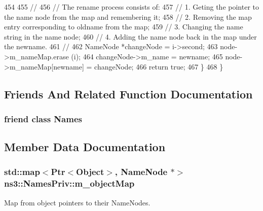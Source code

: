 \begin{DoxyCode}
454 
455       \textcolor{comment}{//}
456       \textcolor{comment}{// The rename process consists of:}
457       \textcolor{comment}{// 1.  Geting the pointer to the name node from the map and remembering it;}
458       \textcolor{comment}{// 2.  Removing the map entry corresponding to oldname from the map;}
459       \textcolor{comment}{// 3.  Changing the name string in the name node;}
460       \textcolor{comment}{// 4.  Adding the name node back in the map under the newname.}
461       \textcolor{comment}{//}
462       NameNode *changeNode = i->second;
463       node->m\_nameMap.erase (i);
464       changeNode->m\_name = newname;
465       node->m\_nameMap[newname] = changeNode;
466       \textcolor{keywordflow}{return} \textcolor{keyword}{true};
467     \}
468 \}
\end{DoxyCode}


\subsection{Friends And Related Function Documentation}
\subsubsection[{\texorpdfstring{Names}{Names}}]{\setlength{\rightskip}{0pt plus 5cm}friend class {\bf Names}\hspace{0.3cm}{\ttfamily [friend]}}\hypertarget{classns3_1_1NamesPriv_a8e6dace6fb74ee2b530528e4ecd0f22c}{}\label{classns3_1_1NamesPriv_a8e6dace6fb74ee2b530528e4ecd0f22c}


\subsection{Member Data Documentation}
\subsubsection[{\texorpdfstring{m\+\_\+object\+Map}{m_objectMap}}]{\setlength{\rightskip}{0pt plus 5cm}std\+::map$<${\bf Ptr}$<${\bf Object}$>$, {\bf Name\+Node} $\ast$$>$ ns3\+::\+Names\+Priv\+::m\+\_\+object\+Map\hspace{0.3cm}{\ttfamily [private]}}\hypertarget{classns3_1_1NamesPriv_a19b615be3c0c142fe0ec7539db8598cf}{}\label{classns3_1_1NamesPriv_a19b615be3c0c142fe0ec7539db8598cf}
Map from object pointers to their Name\+Nodes. 

